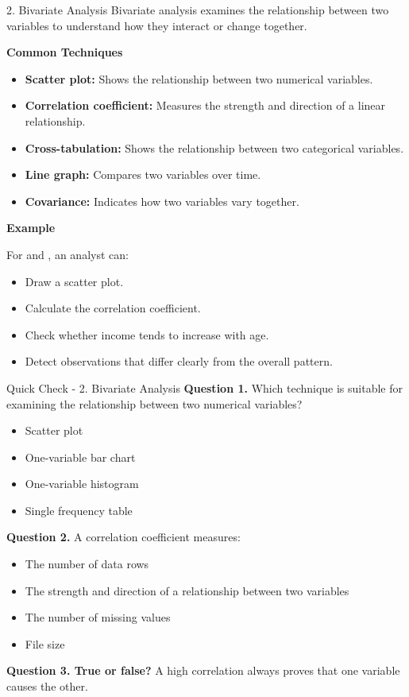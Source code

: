 \documentclass[aspectratio=169,11pt]{beamer}
\begin{document}
\begin{frame}[allowframebreaks]{2. Bivariate Analysis}
\footnotesize
Bivariate analysis examines the relationship between two variables to understand how they interact or change together.\par\medskip
\textbf{Common Techniques}\par\medskip
\begin{itemize}
\item \textbf{Scatter plot:} Shows the relationship between two numerical variables.
\item \textbf{Correlation coefficient:} Measures the strength and direction of a linear relationship.
\item \textbf{Cross-tabulation:} Shows the relationship between two categorical variables.
\item \textbf{Line graph:} Compares two variables over time.
\item \textbf{Covariance:} Indicates how two variables vary together.
\end{itemize}
\textbf{Example}\par\medskip
For \texttt{} and \texttt{}, an analyst can:\par\medskip
\begin{itemize}
\item Draw a scatter plot.
\item Calculate the correlation coefficient.
\item Check whether income tends to increase with age.
\item Detect observations that differ clearly from the overall pattern.
\end{itemize}
\end{frame}
\begin{frame}[allowframebreaks]{Quick Check - 2. Bivariate Analysis}
\footnotesize
\textbf{Question 1.} Which technique is suitable for examining the relationship between two numerical variables?\par\medskip
\begin{itemize}
\item[\textbf{A.}] Scatter plot
\item[\textbf{B.}] One-variable bar chart
\item[\textbf{C.}] One-variable histogram
\item[\textbf{D.}] Single frequency table
\end{itemize}
\textbf{Question 2.} A correlation coefficient measures:\par\medskip
\begin{itemize}
\item[\textbf{A.}] The number of data rows
\item[\textbf{B.}] The strength and direction of a relationship between two variables
\item[\textbf{C.}] The number of missing values
\item[\textbf{D.}] File size
\end{itemize}
\textbf{Question 3. True or false?} A high correlation always proves that one variable causes the other.\par\medskip
\end{frame}
\end{document}
